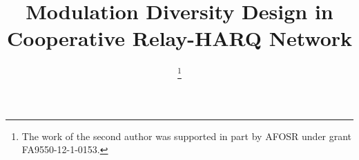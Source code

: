 \documentclass[journal]{IEEEtran}
\begin{document}
%
\title{Modulation Diversity Design in Cooperative Relay-HARQ Network}


\author{
    \thanks{The work of the second author was supported in part by AFOSR under
    grant FA9550-12-1-0153.
    }%
}


% 







\maketitle
\end{document}
